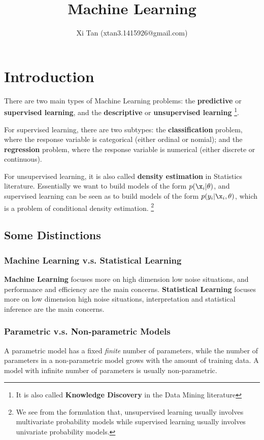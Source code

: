 \documentclass{book}
\begin{document}
\title{Machine Learning}
\author{Xi Tan (xtan3.1415926@gmail.com)}

\maketitle
\tableofcontents



\chapter{Introduction}
There are two main types of Machine Learning problems: the {\bf{predictive}} or {\bf{supervised learning}}, and the {\bf{descriptive}} or {\bf{unsupervised learning}} \footnote{It is also called {\bf{Knowledge Discovery}} in the Data Mining literature}.

For supervised learning, there are two subtypes: the {\bf{classification}} problem, where the response variable is categorical (either ordinal or nomial); and the {\bf{regression}} problem, where the response variable is numerical (either discrete or continuous).

For unsupervised learning, it is also called {\bf{density estimation}} in Statistics literature. Essentially we want to build models of the form $p(\x_i|\theta)$, and supervised learning can be seen as to build models of the form $p(y_i|\x_i,\theta)$, which is a problem of conditional density estimation. \footnote{We see from the formulation that, unsupervised learning usually involves multivariate probability models while supervised learning usually involves univariate probability models.}


\section{Some Distinctions}
\subsection{Machine Learning v.s. Statistical Learning}
{\bf{Machine Learning}} focuses more on high dimension low noise situations, and performance and efficiency are the main concerns. {\bf{Statistical Learning}} focuses more on low dimension high noise situations, interpretation and statistical inference are the main concerns.
\subsection{Parametric v.s. Non-parametric Models}
A parametric model has a fixed {\em{finite}} number of parameters, while the number of parameters in a non-parametric model grows with the amount of training data. A model with infinite number of parameters is usually non-parametric.
\end{document}
